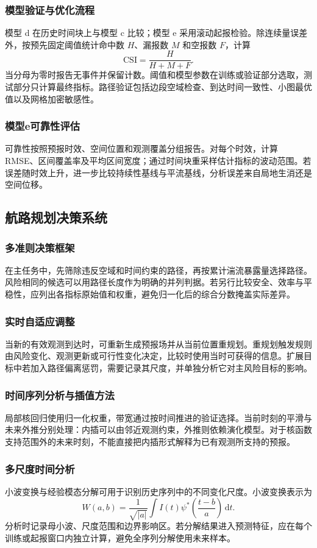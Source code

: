 \subsubsection{模型验证与优化流程}
模型 d 在历史时间块上与模型 c 比较；模型 e 采用滚动起报检验。除连续量误差外，按预先固定阈值统计命中数 $H$、漏报数 $M$ 和空报数 $F$，计算
\begin{equation}
\mathrm{CSI}=\frac{H}{H+M+F}.
\end{equation}
当分母为零时报告无事件并保留计数。阈值和模型参数在训练或验证部分选取，测试部分只计算最终指标。路径验证包括边段空域检查、到达时间一致性、小图最优值以及网格加密敏感性。
\subsubsection{模型e可靠性评估}
可靠性按照预报时效、空间位置和观测覆盖分组报告。对每个时效，计算 RMSE、区间覆盖率及平均区间宽度；通过时间块重采样估计指标的波动范围。若误差随时效上升，进一步比较持续性基线与平流基线，分析误差来自局地生消还是空间位移。
\subsection{航路规划决策系统}
\subsubsection{多准则决策框架}
在主任务中，先筛除违反空域和时间约束的路径，再按累计湍流暴露量选择路径。风险相同的候选可以用路径长度作为明确的并列判据。若另行比较安全、效率与平稳性，应列出各指标原始值和权重，避免归一化后的综合分数掩盖实际差异。
\subsubsection{实时自适应调整}
当新的有效观测到达时，可重新生成预报场并从当前位置重规划。重规划触发规则由风险变化、观测更新或可行性变化决定，比较时使用当时可获得的信息。扩展目标中若加入路径偏离惩罚，需要记录其尺度，并单独分析它对主风险目标的影响。
\subsubsection{时间序列分析与插值方法}
局部核回归使用归一化权重，带宽通过按时间推进的验证选择。当前时刻的平滑与未来外推分别处理：内插可以由邻近观测约束，外推则依赖演化模型。对于核函数支持范围外的未来时刻，不能直接把内插形式解释为已有观测所支持的预报。
\subsubsection{多尺度时间分析}
小波变换与经验模态分解可用于识别历史序列中的不同变化尺度。小波变换表示为
\begin{equation}
W(a,b)=\frac1{\sqrt{|a|}}\int I(t)\psi^*\left(\frac{t-b}{a}\right)\,\mathrm dt.
\end{equation}
分析时记录母小波、尺度范围和边界影响区。若分解结果进入预测特征，应在每个训练或起报窗口内独立计算，避免全序列分解使用未来样本。
